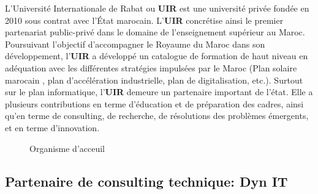 \documentclass[a4paper]{report}
\begin{document}
\begin{doublespace}
	L’Université Internationale de Rabat ou \textbf{UIR} est une université
	privée fondée en 2010 sous contrat avec l’État marocain.
	L'\textbf{UIR} concrétise ainsi le premier partenariat public-privé dans le
	domaine de l'enseignement supérieur au Maroc.
	Poursuivant l'objectif d'accompagner le Royaume du Maroc dans son
	développement, l'\textbf{UIR} a développé un catalogue
	de formation de haut niveau en adéquation avec les différentes stratégies
	impulsées par le Maroc (Plan solaire marocain
	, plan d'accélération industrielle, plan de digitalisation, etc.). Surtout
	sur le plan informatique, l'\textbf{UIR} demeure
	un partenaire important de l'état. Elle a plusieurs contributions en terme
	d'éducation et de préparation des cadres, ainsi
	qu'en terme de consulting, de recherche, de résolutions des problèmes
	émergents, et en terme d’innovation.
	\begin{figure}[H]
		\begin{center}
			\caption{Organisme d'acceuil}
		\end{center}
	\end{figure}
	\subsection{Partenaire de consulting technique: Dyn IT}


\end{doublespace}
\end{document}

